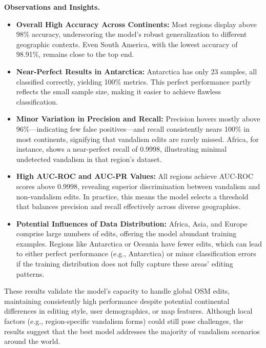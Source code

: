 \documentclass[
    13pt, %
    a4paper, %
    listof=totoc, %
    bibliography=totoc, %
    index=totoc, %
    headsepline
]{scrreprt}
\begin{document}
\noindent
\textbf{Observations and Insights.}
\begin{itemize}
    \item \textbf{Overall High Accuracy Across Continents:} 
    Most regions display above 98\% accuracy, underscoring the model’s robust generalization to different geographic contexts. Even South America, with the lowest accuracy of 98.91\%, remains close to the top end.

    \item \textbf{Near-Perfect Results in Antarctica:}
    Antarctica has only 23 samples, all classified correctly, yielding 100\% metrics. This perfect performance partly reflects the small sample size, making it easier to achieve flawless classification.

    \item \textbf{Minor Variation in Precision and Recall:}
    Precision hovers mostly above 96\%—indicating few false positives—and recall consistently nears 100\% in most continents, signifying that vandalism edits are rarely missed. Africa, for instance, shows a near-perfect recall of 0.9998, illustrating minimal undetected vandalism in that region’s dataset.

    \item \textbf{High AUC-ROC and AUC-PR Values:}
    All regions achieve AUC-ROC scores above 0.9998, revealing superior discrimination between vandalism and non-vandalism edits. In practice, this means the model selects a threshold that balances precision and recall effectively across diverse geographies.

    \item \textbf{Potential Influences of Data Distribution:}
    Africa, Asia, and Europe comprise large numbers of edits, offering the model abundant training examples. Regions like Antarctica or Oceania have fewer edits, which can lead to either perfect performance (e.g., Antarctica) or minor classification errors if the training distribution does not fully capture these areas’ editing patterns.

\end{itemize}

\noindent
These results validate the model’s capacity to handle global OSM edits, maintaining consistently high performance despite potential continental differences in editing style, user demographics, or map features. Although local factors (e.g., region-specific vandalism forms) could still pose challenges, the results suggest that the best model addresses the majority of vandalism scenarios around the world.
\end{document}
